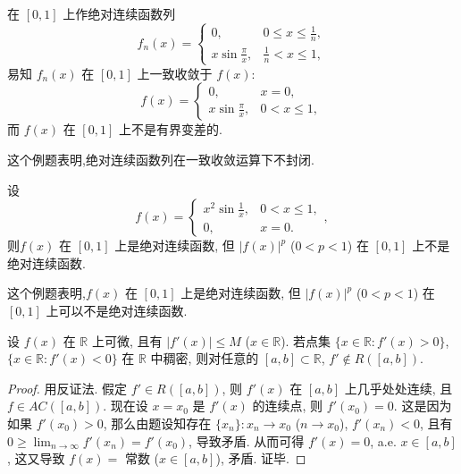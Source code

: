 \documentclass[../../main.tex]{subfiles}%
\begin{document}
\begin{example}
在 $[0,1]$ 上作绝对连续函数列
\[
f_n(x) =
\begin{cases}
0, & 0\leqslant x\leqslant \frac{1}{n}, \\
x\sin\frac{\pi}{x}, & \frac{1}{n}<x\leqslant 1,
\end{cases}
\]
易知 $f_n(x)$ 在 $[0,1]$ 上一致收敛于 $f(x)$:
\[
f(x) =
\begin{cases}
0, & x=0, \\
x\sin\frac{\pi}{x}, & 0<x\leqslant 1,
\end{cases}
\]
而 $f(x)$ 在 $[0,1]$ 上不是有界变差的.
\end{example}
\begin{remark}
这个例题表明,绝对连续函数列在一致收敛运算下不封闭.
\end{remark}

\begin{example}
设
\[
f(x) =
\begin{cases}
x^2\sin\frac{1}{x}, & 0<x\leqslant 1, \\
0, & x=0.
\end{cases},
\]
则$f(x)$ 在 $[0,1]$ 上是绝对连续函数, 但 $|f(x)|^p$ ($0<p<1$) 在 $[0,1]$ 上不是绝对连续函数.
\end{example}
\begin{remark}
这个例题表明,$f(x)$ 在 $[0,1]$ 上是绝对连续函数, 但 $|f(x)|^p$ ($0<p<1$) 在 $[0,1]$ 上可以不是绝对连续函数.
\end{remark}

\begin{example}
设 $f(x)$ 在 $\mathbb{R}$ 上可微, 且有 $|f'(x)|\leqslant M$ ($x\in\mathbb{R}$). 若点集 $\{x\in\mathbb{R}: f'(x)>0\}$, $\{x\in\mathbb{R}: f'(x)<0\}$ 在 $\mathbb{R}$ 中稠密, 则对任意的 $[a,b]\subset\mathbb{R}$, $f'\notin R([a,b])$.
\end{example}
\begin{proof}
用反证法. 假定 $f'\in R([a,b])$, 则 $f'(x)$ 在 $[a,b]$ 上几乎处处连续, 且 $f\in  AC([a,b])$. 现在设 $x=x_0$ 是 $f'(x)$ 的连续点, 则 $f'(x_0)=0$. 这是因为如果 $f'(x_0)>0$, 那么由题设知存在 $\{x_n\}: x_n\to x_0$ ($n\to x_0$), $f'(x_n)<0$, 且有 $0\geqslant \lim_{n\to\infty} f'(x_n)=f'(x_0)$, 导致矛盾. 从而可得 $f'(x)=0$, a.e. $x\in[a,b]$, 这又导致 $f(x)=$ 常数 ($x\in[a,b]$), 矛盾. 证毕.
\end{proof}
\end{document}
